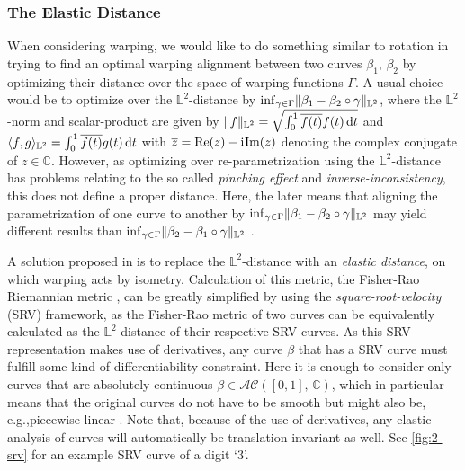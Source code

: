 \subsubsection*{The Elastic Distance}
When considering warping, we would like to do something similar to rotation in trying to find an optimal warping alignment between two curves $\beta_1$, $\beta_2$ by optimizing their distance over the space of warping functions $\Gamma$.
A usual choice would be to optimize over the $\mathbb{L}^2$-distance by $\inf_{\gamma \in \Gamma} \lVert\beta_1 - \beta_2 \circ \gamma\rVert_{\mathbb{L}^2}$, where the $\mathbb{L}^2$-norm and scalar-product are given by $\lVert f\rVert_{\mathbb{L}^2} = \sqrt{\int_0^1 \overline{f(t)} f(t) \mathop{\mathrm{d}t}}$ and $\langle f,g\rangle_{\mathbb{L}^2} = \int_0^1 \overline{f(t)} g(t) \mathop{\mathrm{d}t}$ with $\overline{z} = \mathrm{Re}(z) - \mathrm{i}\mkern1mu \mathrm{Im}(z)$ denoting the complex conjugate of $z \in \mathbb{C}$.
However, as optimizing over re-parametrization using the $\mathbb{L}^2$-distance has problems relating to the so called \emph{pinching effect} and \emph{inverse-inconsistency}, this does not define a proper distance.
Here, the later means that aligning the parametrization of one curve to another by $\inf_{\gamma \in \Gamma} \lVert\beta_1 - \beta_2 \circ \gamma\rVert_{\mathbb{L}^2}$ may yield different results than $\inf_{\gamma \in \Gamma} \lVert\beta_2 - \beta_1 \circ \gamma\rVert_{\mathbb{L}^2}$ \parencite[see][88-90]{SrivastavaKlassen2016}.

A solution proposed in \cite{SrivastavaEtAl2011} is to replace the $\mathbb{L}^2$-distance with an \emph{elastic distance}, on which warping acts by isometry.
Calculation of this metric, the Fisher-Rao Riemannian metric \parencite{Rao1945}, can be greatly simplified by using the \emph{square-root-velocity} (SRV) framework, as the Fisher-Rao metric of two curves can be equivalently calculated as the $\mathbb{L}^2$-distance of their respective SRV curves.
As this SRV representation makes use of derivatives, any curve $\beta$ that has a SRV curve must fulfill some kind of differentiability constraint.
Here it is enough to consider only curves that are absolutely continuous $\beta \in \mathcal{AC}([0,1],\, \mathbb{C})$, which in particular means that the original curves do not have to be smooth but might also be, e.g.,piecewise linear \parencite[see][91]{SrivastavaKlassen2016}.
Note that, because of the use of derivatives, any elastic analysis of curves will automatically be translation invariant as well.
See \cref{fig:2-srv} for an example SRV curve of a digit \enquote*{3}.

